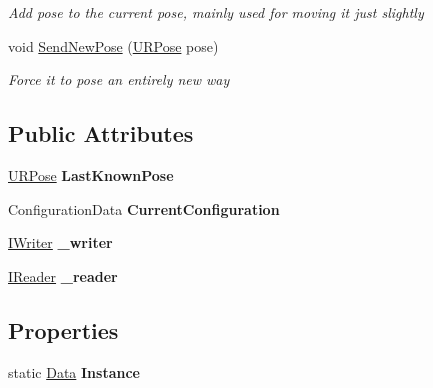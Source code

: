\begin{DoxyCompactItemize}
\begin{DoxyCompactList}\small\item\em Add pose to the current pose, mainly used for moving it just slightly \end{DoxyCompactList}\item 
void \hyperlink{class_robo_library_1_1_data_a232af8e278fa53d435a14a10fed14bd6}{Send\+New\+Pose} (\hyperlink{class_robo_library_1_1_u_r_pose}{U\+R\+Pose} pose)
\begin{DoxyCompactList}\small\item\em Force it to pose an entirely new way \end{DoxyCompactList}\end{DoxyCompactItemize}
\subsection*{Public Attributes}
\begin{DoxyCompactItemize}
\item 
\hypertarget{class_robo_library_1_1_data_adb42d9d11d9c0b0b9db51f7e7fee4734}{}\label{class_robo_library_1_1_data_adb42d9d11d9c0b0b9db51f7e7fee4734} 
\hyperlink{class_robo_library_1_1_u_r_pose}{U\+R\+Pose} {\bfseries Last\+Known\+Pose}
\item 
\hypertarget{class_robo_library_1_1_data_aac94b89832c7eb9510f7dc70f4f3e078}{}\label{class_robo_library_1_1_data_aac94b89832c7eb9510f7dc70f4f3e078} 
Configuration\+Data {\bfseries Current\+Configuration}
\item 
\hypertarget{class_robo_library_1_1_data_ae420bf28c2cb531de157e5e6d93310d3}{}\label{class_robo_library_1_1_data_ae420bf28c2cb531de157e5e6d93310d3} 
\hyperlink{interface_robo_library_1_1_interfaces_1_1_i_writer}{I\+Writer} {\bfseries \+\_\+writer}
\item 
\hypertarget{class_robo_library_1_1_data_ac28ff26332ce8e9a7e2ec0c3696563e3}{}\label{class_robo_library_1_1_data_ac28ff26332ce8e9a7e2ec0c3696563e3} 
\hyperlink{interface_robo_library_1_1_interfaces_1_1_i_reader}{I\+Reader} {\bfseries \+\_\+reader}
\end{DoxyCompactItemize}
\subsection*{Properties}
\begin{DoxyCompactItemize}
\item 
\hypertarget{class_robo_library_1_1_data_a23db00823e874b31b9272572809e0207}{}\label{class_robo_library_1_1_data_a23db00823e874b31b9272572809e0207} 
static \hyperlink{class_robo_library_1_1_data}{Data} {\bfseries Instance}
\end{DoxyCompactItemize}

